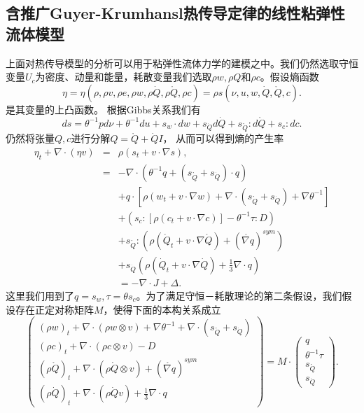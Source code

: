 \subsection{含推广Guyer-Krumhansl热传导定律的线性粘弹性流体模型}
上面对热传导模型的分析可以用于粘弹性流体力学的建模之中。我们仍然选取守恒变量$U_c$为密度、动量和能量，耗散变量我们选取$\rho w, \rho Q$和$ \rho c$。假设熵函数
\begin{equation*}
	\eta = \eta (\rho,\rho v,\rho e,\rho w,\rho \dot{Q},\rho \mathring{Q},\rho c) = \rho s(\nu,u,w,\dot{Q},\mathring{Q},c).
\end{equation*}
是其变量的上凸函数。
根据Gibbs关系我们有
\begin{equation*}
			ds = \theta^{-1} pd\nu + \theta^{-1} du + s_w \cdot dw + s_{\dot{Q}} d \dot{Q} +　s_{\mathring{Q}} : d \mathring{Q}+ s_c : dc.
\end{equation*}
仍然将张量$Q,c$进行分解$Q = \mathring{Q} +\dot{Q}I$，
从而可以得到熵的产生率
\begin{eqnarray*}
		\eta_t + \nabla \cdot (\eta v) &=& \rho (s_t + v \cdot \nabla s), \\
		&=& -\nabla \cdot (\theta^{-1} q + (s_{\mathring{{Q}}}+s_{\dot{Q}}) \cdot {q} )  \\
		&&+ q \cdot [\rho (w_t + v \cdot \nabla w) + \nabla \cdot (s_{\mathring{{Q}}}+s_{\dot{Q}}) + \nabla \theta^{-1}] \\
		&&+ (s_c:[\rho (c_t + v \cdot \nabla c)] - \theta^{-1} \tau : D) \\
		&&+s_{\mathring{{Q}}}:(\rho (\mathring{{Q}}_t + v \cdot \nabla \mathring{Q})+(\mathring{\nabla {q}})^{sym}) \\
		&&+s_{\dot{Q}}(\rho (\dot{Q}_t + v \cdot \nabla \dot{Q})+\frac{1}{3}\nabla \cdot {q}) \\
		&& = -\nabla \cdot J + \Delta. 
\end{eqnarray*}
这里我们用到了$q=s_w,\tau = \theta s_c$。为了满足守恒－耗散理论的第二条假设，我们假设存在正定对称矩阵$M$，使得下面的本构关系成立
\begin{equation*}
   	\left( \begin{array}{c} 
			(\rho w)_t +  \nabla \cdot (\rho w \otimes v)  + \nabla \theta^{-1} + \nabla \cdot (s_{\mathring{{Q}}}+s_{\dot{Q}})\\
			(\rho c)_t +  \nabla \cdot (\rho c \otimes v)  - D \\
			(\rho \mathring{{Q}})_t + \nabla \cdot (\rho \mathring{Q} \otimes v)+(\mathring{\nabla {q}})^{sym} \\ (\rho \dot{Q})_t + \nabla \cdot (\rho \dot{Q} v)+\frac{1}{3} \nabla \cdot {q}
		\end{array} \right) = M \cdot
		\left( \begin{array}{c} 
			q \\ \theta^{-1} \tau \\s_{\mathring{{Q}}} \\s_{\dot{Q}}
		\end{array}\right).
\end{equation*} 
